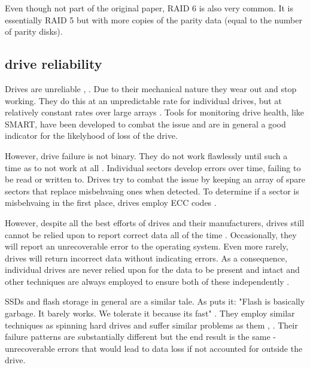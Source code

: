             Even though not part of the original paper, RAID 6 is also very
            common. It is essentially RAID 5 but with more copies of the parity
            data (equal to the number of parity disks).

        \subsection{drive reliability}
            \label{sec_reliability}

            Drives are unreliable \cite{RAID}, \cite{Backblaze (idk which one)}.
            Due to their mechanical nature they wear out and stop working. They
            do this at an unpredictable rate for individual drives, but at
            relatively constant rates over large arrays \cite{Backblaze_stats}.
            Tools for monitoring drive health, like SMART, have been developed
            to combat the issue and are in general a good indicator for the
            likelyhood of loss of the drive.

            However, drive failure is not binary. They do not work flawlessly
            until such a time as to not work at all \cite{2D_RAID}. Individual
            sectors develop errors over time, failing to be read or written to.
            Drives try to combat the issue by keeping an array of spare sectors
            that replace misbehvaing ones when detected. To determine if a
            sector is misbehvaing in the first place, drives employ ECC codes
            \cite{data_corruption_storage_stack, although maybe someone else}.

            However, despite all the best efforts of drives and their
            manufacturers, drives still cannot be relied upon to report correct
            data all of the time \cite{data_corruption_storage_stack}.
            Occasionally, they will report an unrecoverable error to the
            operating system. Even more rarely, drives will return incorrect
            data without indicating errors. As a consequence, individual drives
            are never relied upon for the data to be present and intact and
            other techniques are always employed to ensure both of these
            independently \cite{LTT_data_loss?}.

            SSDs and flash storage in general are a similar tale. As
            \citeauthor{2D_RAID} puts it: "Flash is basically garbage. It
            barely works. We tolerate it because its fast" \cite{2D_RAID}. They
            employ similar techniques as spinning hard drives and suffer
            similar problems as them \cite{flash_large_scale},
            \cite{flash_reliability}. Their failure patterns are substantially
            different but the end result is the same - unrecoverable errors
            that would lead to data loss if not accounted for outside the
            drive.

